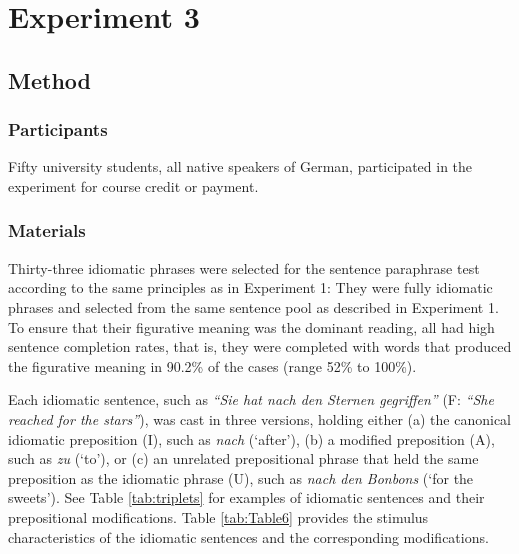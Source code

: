 \section{Experiment 3}

\subsection{Method}

\subsubsection{Participants}

Fifty university students, all native speakers of German, participated in the experiment for course credit or payment.

\subsubsection{Materials}
Thirty-three idiomatic phrases were selected for the sentence paraphrase test according to the same principles as in Experiment 1: They were fully idiomatic phrases and selected from the same sentence pool as described in Experiment 1.  To ensure that their figurative meaning was the dominant reading, all had high sentence completion rates, that is, they were completed with words that produced the figurative meaning in 90.2\% of the cases (range 52\% to 100\%).

Each idiomatic sentence, such as \textit{``Sie hat nach den Sternen gegriffen''} (F: \textit{``She reached for the stars''}), was cast in three versions, holding either (a) the canonical idiomatic preposition (I), such as \textit{nach} (‘after’), (b) a modified preposition (A), such as \textit{zu} (‘to’), or (c) an unrelated prepositional phrase that held the same preposition as the idiomatic phrase (U), such as \textit{nach den Bonbons} (‘for the sweets’). See Table \ref{tab:triplets} for examples of idiomatic sentences and their prepositional modifications. Table \ref{tab:Table6} provides the stimulus characteristics of the idiomatic sentences and the corresponding modifications.

